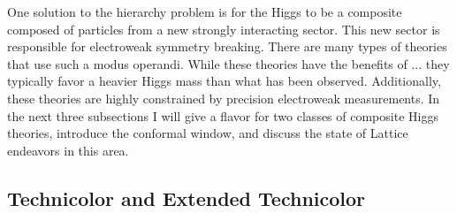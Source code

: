 
One solution to the hierarchy problem is for the Higgs to be a composite composed of particles from a new strongly interacting sector.
This new sector is responsible for electroweak symmetry breaking.
There are many types of theories that use such a modus operandi.
While these theories have the benefits of ... they typically favor a heavier Higgs mass than what has been observed.
Additionally, these theories are highly constrained by precision electroweak measurements.
In the next three subsections I will give a flavor for two classes of composite Higgs theories, introduce the conformal window, and discuss the state of Lattice endeavors in this area.

\subsection{Technicolor and Extended Technicolor}



